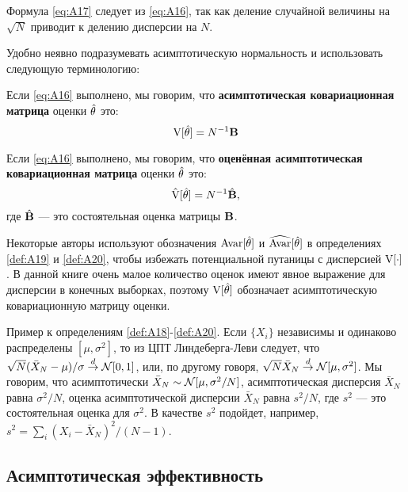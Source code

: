 Формула \ref{eq:A17} следует из \ref{eq:A16}, так как деление случайной величины на $\sqrt{N}$ приводит к делению дисперсии на $N$.

Удобно неявно подразумевать асимптотическую нормальность и использовать следующую терминологию:

\begin{definition}
\label{def:A19}
Если \ref{eq:A16} выполнено, мы говорим, что \textbf{асимптотическая ковариационная матрица} оценки $\hat{\mathbf{\theta}}$ это:
\begin{equation}
	\label{eq:A18}
	\mathrm{V}[\hat{\mathbf{\theta}}]=N^{-1}\mathbf{B}
\end{equation}	
\end{definition}

\begin{definition}
\label{def:A20}
Если \ref{eq:A16} выполнено, мы говорим, что \textbf{оценённая асимптотическая ковариационная матрица} оценки $\hat{\mathbf{\theta}}$ это:
\begin{equation}
	\label{eq:A19}
	\hat{\mathrm{V}}[\hat{\mathbf{\theta}}]=N^{-1}\hat{\mathbf{B}},
\end{equation}	
где $\hat{\mathbf{B}}$ --- это состоятельная оценка матрицы $\mathbf{B}$.
\end{definition}

Некоторые авторы используют обозначения $\mathrm{Avar}[\hat{\mathbf{\theta}}]$ и $\widehat{\mathrm{Avar}}[\hat{\mathbf{\theta}}]$ в определениях \ref{def:A19} и \ref{def:A20}, чтобы избежать потенциальной путаницы с дисперсией $\mathrm{V}[\cdot]$. В данной книге очень малое количество оценок имеют явное выражение для дисперсии в конечных выборках, поэтому $\mathrm{V}[\hat{\mathbf{\theta}}]$ обозначает асимптотическую ковариационную матрицу оценки.


Пример к определениям \ref{def:A18}-\ref{def:A20}. Если $\{X_i\}$ независимы и одинаково распределены $[\mu, \sigma^2]$, то из ЦПТ Линдеберга-Леви следует, что $\sqrt{N}(\bar{X}_N-\mu)/\sigma \overset{d}{\to} \mathcal{N} [ 0,1]$, или, по другому говоря, $\sqrt{N}\bar{X}_N \overset{d}{\to} \mathcal{N} [\mu,\sigma^2]$. Мы говорим, что асимптотически $\bar{X}_N \sim \mathcal{N}[\mu,\sigma^2/N]$, асимптотическая дисперсия $\bar{X}_N$ равна $\sigma^2/N$, оценка асимптотической дисперсии $\bar{X}_N$ равна $s^2/N$, где $s^2$  --- это состоятельная оценка для $\sigma^2$. В качестве $s^2$ подойдет, например, $s^2=\sum_i (X_i - \bar{X}_N)^2/(N-1)$.

\subsection{Асимптотическая эффективность}

